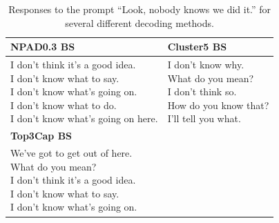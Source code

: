 \begin{table}[t]
\begin{tabular}{|l|l|}
    \textbf{NPAD0.3 BS} & \textbf{Cluster5 BS} \\
    \hline
\makecell[l]{
I don't think it's a good idea. \\
I don't know what to say. \\
I don't know what's going on. \\
I don't know what to do. \\
I don't know what's going on here. \\
}&
\makecell[l]{
I don't know why. \\
What do you mean? \\
I don't think so. \\
How do you know that? \\
I'll tell you what. \\
}\\
\hline
\hline

\textbf{Top3Cap BS} & \\
\hline
\makecell[l]{
We've got to get out of here. \\
What do you mean? \\
I don't think it's a good idea. \\
I don't know what to say. \\
I don't know what's going on. \\
} & \\

\hline
    \end{tabular}
    \caption{Responses to the prompt ``Look, nobody knows we did it.'' for several different decoding methods.}
    \label{examplesB}
\end{table}

